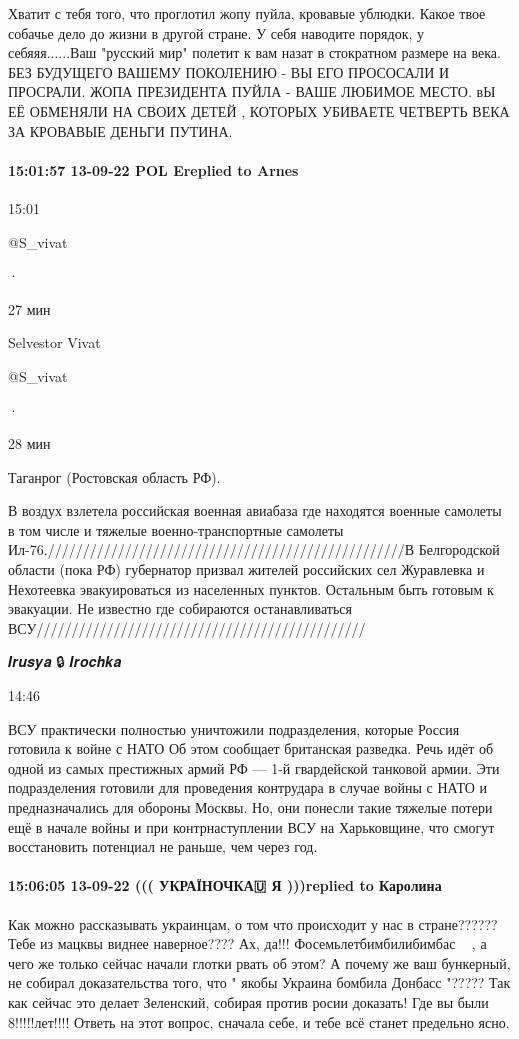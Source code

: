 Хватит с тебя того, что проглотил жопу пуйла, кровавые ублюдки. Какое твое
собачье дело до жизни в другой стране. У себя наводите порядок, у
себяяя......Ваш "русский мир" полетит к вам назат в стократном размере на века.
БЕЗ БУДУЩЕГО ВАШЕМУ ПОКОЛЕНИЮ - ВЫ ЕГО ПРОСОСАЛИ И ПРОСРАЛИ. ЖОПА ПРЕЗИДЕНТА
ПУЙЛА - ВАШЕ ЛЮБИМОЕ МЕСТО. вЫ ЕЁ ОБМЕНЯЛИ НА СВОИХ ДЕТЕЙ , КОТОРЫХ УБИВАЕТЕ
ЧЕТВЕРТЬ ВЕКА ЗА КРОВАВЫЕ ДЕНЬГИ ПУТИНА.

\paragraph{15:01:57 13-09-22 POL Ereplied to Arnes}
15:01

@S_vivat

·

27 мин

Selvestor Vivat

@S_vivat

·

28 мин

Таганрог (Ростовская область РФ).

В воздух взлетела российская военная авиабаза где находятся военные самолеты в том числе и тяжелые военно-транспортные самолеты Ил-76.///////////////////////////////////////////////////В Белгородской области (пока РФ) губернатор призвал жителей российских сел Журавлевка и Нехотеевка эвакуироваться из населенных пунктов.
Остальным быть готовым к эвакуации. Не известно где собираются останавливаться ВСУ///////////////////////////////////////////////

𝑰𝒓𝒖𝒔𝒚𝒂 🔒 𝑰𝒓𝒐𝒄𝒉𝒌𝒂

14:46

ВСУ практически полностью уничтожили подразделения, которые Россия готовила к войне с НАТО
Об этом сообщает британская разведка. Речь идёт об одной из самых престижных армий РФ — 1-й гвардейской танковой армии. Эти подразделения готовили для проведения контрудара в случае войны с НАТО и предназначались для обороны Москвы.
Но, они понесли такие тяжелые потери ещё в начале войны и при контрнаступлении ВСУ на Харьковщине, что смогут восстановить потенциал не раньше, чем через год.

\paragraph{15:06:05 13-09-22 ((( УКРАЇНОЧКА🇺 Я )))replied to Каролина}

Как можно рассказывать украинцам, о том что происходит у нас в стране??????
Тебе из мацквы виднее наверное???? Ах, да!!! Фосемьлетбимбилибимбас 🤣🤣🤣, а
чего же только сейчас начали глотки рвать об этом? А почему же ваш бункерный,
не собирал доказательства того, что " якобы Украина бомбила Донбасс "????? Так
как сейчас это делает Зеленский, собирая против росии доказать! Где вы были
8!!!!!лет!!!! Ответь на этот вопрос, сначала себе, и тебе всё станет предельно
ясно.

